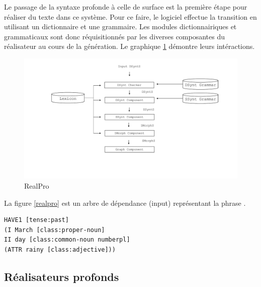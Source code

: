 Le passage de la syntaxe profonde à celle de surface est la première étape pour réaliser du texte dans ce système. Pour ce faire, le logiciel effectue la transition en utilisant un dictionnaire et une grammaire. Les modules dictionnairiques et grammaticaux sont donc réquisitionnés par les diverses composantes du réalisateur au cours de la génération. Le graphique \ref{fig:RealPro} démontre leurs intéractions. 
\begin{figure}[htb]
	\centering
	\includegraphics[width=1\textwidth, trim = {0cm 0cm 0cm 0cm},clip]{ch2/figs/realpro.pdf}
	\caption{RealPro}
	\label{fig:RealPro}
\end{figure}

La figure \ref{realpro} est un arbre de dépendance (input) représentant la phrase  .

\begin{lstlisting}[language=Xml, caption=Input, label=realpro]
HAVE1 [tense:past]
(I March [class:proper-noun]
II day [class:common-noun numberpl]
(ATTR rainy [class:adjective]))
\end{lstlisting}



\subsection{Réalisateurs profonds}

